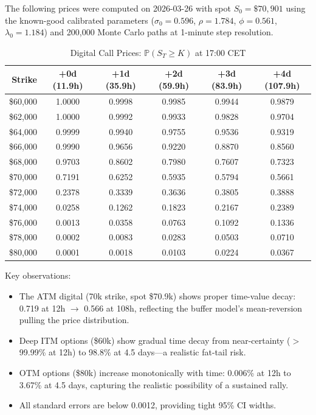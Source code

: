 \documentclass[11pt,a4paper]{article}
\newcommand{\Prob}{\mathbb{P}}
\begin{document}
The following prices were computed on 2026-03-26 with spot $S_0 = \$70{,}901$
using the known-good calibrated parameters ($\sigma_0 = 0.596$, $\rho = 1.784$,
$\phi = 0.561$, $\lambda_0 = 1.184$) and 200{,}000 Monte Carlo paths at
1-minute step resolution.

\begin{table}[H]
\centering
\caption{Digital Call Prices: $\Prob(S_T \geq K)$ at 17:00 CET}
\label{tab:digital_prices}
\small
\begin{tabular}{r|ccccc}
\toprule
\textbf{Strike} & \textbf{+0d (11.9h)} & \textbf{+1d (35.9h)} & \textbf{+2d (59.9h)} & \textbf{+3d (83.9h)} & \textbf{+4d (107.9h)} \\
\midrule
\$60{,}000 & 1.0000 & 0.9998 & 0.9985 & 0.9944 & 0.9879 \\
\$62{,}000 & 1.0000 & 0.9992 & 0.9933 & 0.9828 & 0.9704 \\
\$64{,}000 & 0.9999 & 0.9940 & 0.9755 & 0.9536 & 0.9319 \\
\$66{,}000 & 0.9990 & 0.9656 & 0.9220 & 0.8870 & 0.8560 \\
\$68{,}000 & 0.9703 & 0.8602 & 0.7980 & 0.7607 & 0.7323 \\
\$70{,}000 & 0.7191 & 0.6252 & 0.5935 & 0.5794 & 0.5661 \\
\$72{,}000 & 0.2378 & 0.3339 & 0.3636 & 0.3805 & 0.3888 \\
\$74{,}000 & 0.0258 & 0.1262 & 0.1823 & 0.2167 & 0.2389 \\
\$76{,}000 & 0.0013 & 0.0358 & 0.0763 & 0.1092 & 0.1336 \\
\$78{,}000 & 0.0002 & 0.0083 & 0.0283 & 0.0503 & 0.0710 \\
\$80{,}000 & 0.0001 & 0.0018 & 0.0103 & 0.0224 & 0.0367 \\
\bottomrule
\end{tabular}
\end{table}

Key observations:
\begin{itemize}[nosep]
  \item The ATM digital (70k strike, spot \$70.9k) shows proper time-value
    decay: 0.719 at 12h $\to$ 0.566 at 108h, reflecting the buffer model's
    mean-reversion pulling the price distribution.
  \item Deep ITM options (\$60k) show gradual time decay from near-certainty
    ($>$99.99\% at 12h) to 98.8\% at 4.5 days---a realistic fat-tail risk.
  \item OTM options (\$80k) increase monotonically with time: 0.006\% at
    12h to 3.67\% at 4.5 days, capturing the realistic possibility of a
    sustained rally.
  \item All standard errors are below 0.0012, providing tight 95\% CI widths.
\end{itemize}
\end{document}
